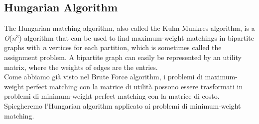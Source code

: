\begin{figure}[H]
    \centering
    \begin{minipage}{0.45\textwidth}
        \centering
        \caption{}
        \label{fig:match_1}
    \end{minipage}
    \hfill
    \begin{minipage}{0.45\textwidth}
        \centering
        \caption{}
        \label{fig:match_2}
    \end{minipage}
\end{figure}

\subsection{Hungarian Algorithm}

The Hungarian matching algorithm, also called the Kuhn-Munkres algorithm, is a \textit{O}($\textit{n}^3$) algorithm that can be used to find maximum-weight matchings in bipartite graphs with \textit{n} vertices for each partition, which is sometimes called the assignment problem.
A bipartite graph can easily be represented by an utility matrix, where the weights of edges are the entries. \\
Come abbiamo già visto nel Brute Force algorithm, i problemi di maximum-weight perfect matching con la matrice di utilità possono essere trasformati in problemi di minimum-weight perfect matching con la matrice di costo.
Spiegheremo l'Hungarian algorithm applicato ai problemi di minimum-weight matching.
\\

